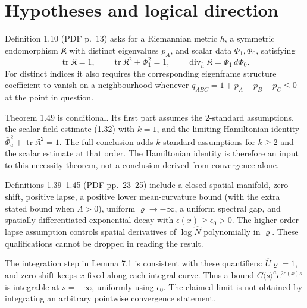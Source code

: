 \documentclass[10pt]{article}
\begin{document}
\section*{Hypotheses and logical direction}
Definition 1.10 (PDF p. 13) asks for a Riemannian metric \(\bar h\), a symmetric endomorphism \(\mathfrak K\) with distinct eigenvalues \(p_A\), and scalar data \(\Phi_1,\Phi_0\), satisfying \[\operatorname{tr}\mathfrak K=1,\qquad
 \operatorname{tr}\mathfrak K^2+\Phi_1^2=1,\qquad
 \operatorname{div}_{\bar h}\mathfrak K=\Phi_1\,d\Phi_0.\] For distinct indices it also requires the corresponding eigenframe structure coefficient to vanish on a neighbourhood whenever \(q_{ABC}=1+p_A-p_B-p_C\leq0\) at the point in question.\par
Theorem 1.49 is conditional. Its first part assumes the 2-standard assumptions, the scalar-field estimate (1.32) with \(k=1\), and the limiting Hamiltonian identity \(\bar\Phi_a^2+\operatorname{tr}\mathfrak K^2=1\). The full conclusion adds \(k\)-standard assumptions for \(k\geq2\) and the scalar estimate at that order. The Hamiltonian identity is therefore an input to this necessity theorem, not a conclusion derived from convergence alone.\par
Definitions 1.39–1.45 (PDF pp. 23–25) include a closed spatial manifold, zero shift, positive lapse, a positive lower mean-curvature bound (with the extra stated bound when \(\Lambda>0\)), uniform \(\varrho\to-\infty\), a uniform spectral gap, and spatially differentiated exponential decay with \(\epsilon(x)\geq\epsilon_0>0\). The higher-order lapse assumption controls spatial derivatives of \(\log\widehat N\) polynomially in \(\varrho\). These qualifications cannot be dropped in reading the result.\par
The integration step in Lemma 7.1 is consistent with these quantifiers: \(\widehat U\varrho=1\), and zero shift keeps \(x\) fixed along each integral curve. Thus a bound \(C\langle s\rangle^a e^{2\epsilon(x)s}\) is integrable at \(s=-\infty\), uniformly using \(\epsilon_0\). The claimed limit is not obtained by integrating an arbitrary pointwise convergence statement.\par
\end{document}
